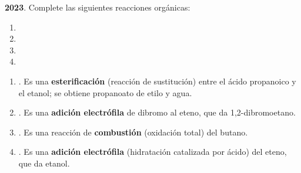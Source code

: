 \begin{exerciseEVAU}
    \textbf{2023}. Complete las siguientes reacciones orgánicas:
    \begin{enumerate}[label=\letraminuscula]
    \item {}
    \item {}
    \item {}
    \item {}
    \end{enumerate}
    \begin{solu}
        \begin{enumerate}[label=\letraminuscula]
            \item {}. Es una \textbf{esterificación} (reacción de sustitución) entre el ácido propanoico y el etanol; se obtiene propanoato de etilo y agua.

            \item {}. Es una \textbf{adición electrófila} de dibromo al eteno, que da 1,2-dibromoetano.

            \item {}. Es una reacción de \textbf{combustión} (oxidación total) del butano.

            \item {}. Es una \textbf{adición electrófila} (hidratación catalizada por ácido) del eteno, que da etanol.
        \end{enumerate}
    \end{solu}
\end{exerciseEVAU}


